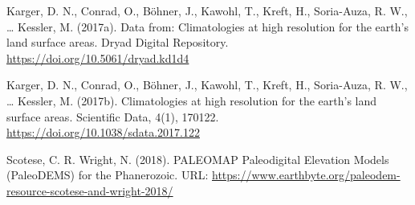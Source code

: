 \documentclass[]{article}
\begin{document}
Karger, D. N., Conrad, O., Böhner, J., Kawohl, T., Kreft, H.,
Soria-Auza, R. W., \ldots{} Kessler, M. (2017a). Data from:
Climatologies at high resolution for the earth's land surface areas.
Dryad Digital Repository. \url{https://doi.org/10.5061/dryad.kd1d4}

Karger, D. N., Conrad, O., Böhner, J., Kawohl, T., Kreft, H.,
Soria-Auza, R. W., \ldots{} Kessler, M. (2017b). Climatologies at high
resolution for the earth's land surface areas. Scientific Data, 4(1),
170122. \url{https://doi.org/10.1038/sdata.2017.122}

Scotese, C. R. Wright, N. (2018). PALEOMAP Paleodigital Elevation Models
(PaleoDEMS) for the Phanerozoic. URL:
\url{https://www.earthbyte.org/paleodem-resource-scotese-and-wright-2018/}
\end{document}
